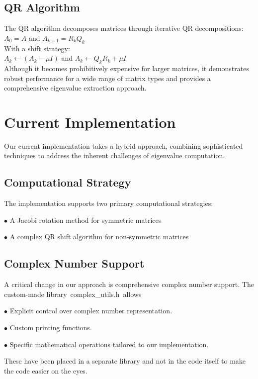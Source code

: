 \documentclass[a4paper,12pt]{article}
\begin{document}
\subsection{QR Algorithm}
\label{qr-alg}
    The QR algorithm decomposes matrices through iterative QR decompositions:\\
$A_0 = A$ and $A_{k+1} = R_k Q_k$\\
With a shift strategy:\\
$A_k \leftarrow (A_k - \mu I)$ and $A_k \leftarrow Q_k R_k + \mu I$\\
Although it becomes prohibitively expensive for larger matrices, it demonstrates robust performance for a wide range of matrix types and provides a comprehensive eigenvalue extraction approach.

\section{Current Implementation}
\label{curr-imp}
    Our current implementation takes a hybrid approach, combining sophisticated techniques to address the inherent challenges of eigenvalue computation.

\subsection{Computational Strategy}
\label{comp-strat}
    The implementation supports two primary computational strategies:
    
    $\bullet$ A Jacobi rotation method for symmetric matrices
    
    $\bullet$ A complex QR shift algorithm for non-symmetric matrices

\subsection{Complex Number Support}
\label{cpx-numb:sp}
A critical change in our approach is comprehensive complex number support. The custom-made library\ \textlangle complex\_utils.h\textrangle\  allows
    
    $\bullet$ Explicit control over complex number representation.
    
    $\bullet$ Custom printing functions.
    
    $\bullet$ Specific mathematical operations tailored to our implementation.
    
\noindent These have been placed in a separate library and not in the code itself to make the code easier on the eyes.
\end{document}
